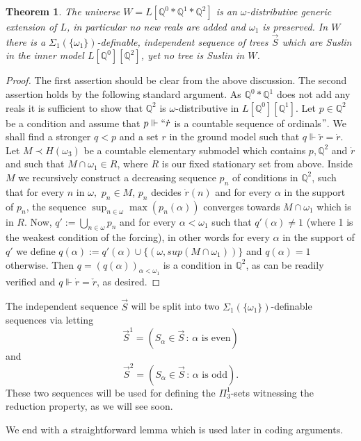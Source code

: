 \documentclass[a4paper,11pt]{article}
\newtheorem{theorem}{Theorem}[section]
\newcommand{\forceQ}{\mathbb{Q}}
\begin{document}
\begin{theorem}
The universe $W= L[\forceQ^0 \ast \forceQ^1 \ast \forceQ^2]$ is an $\omega$-distributive generic extension of $L$, in particular no new reals are added and $\omega_1$ is preserved. In $W$ there is a $\Sigma_1(\{\omega_1\})$-definable, independent sequence of  trees $\vec{S}$ which are Suslin in the inner model $L[\forceQ^0][\forceQ^2]$, yet no tree is Suslin in $W$. 
\end{theorem}
\begin{proof}
The first assertion should be clear from the above discussion. The second assertion holds by the following standard argument. As $\forceQ^0 \ast \forceQ^1$ does not add any reals it is sufficient to show that $\forceQ^2$ is $\omega$-distributive in $L[\forceQ^0][\forceQ^1]$.
Let $p \in \forceQ^2$ be a condition and assume that $p \Vdash ``\dot{r} $ is a countable sequence of ordinals$"$. We shall find a stronger $q < p$ and a set $r$ in the ground model such that $q \Vdash \check{r}=\dot{r}$. Let $M \prec H(\omega_3)$ be a countable elementary submodel which contains $p, \forceQ^2$ and $\dot{r}$ and such that $M \cap \omega_1 \in R$, where $R$ is our fixed stationary set from above. Inside $M$ we recursively construct a decreasing sequence $p_n$ of conditions in $\forceQ^2$, such that for every $n$ in $\omega,$ $p_n \in M$, $p_n$ decides $\dot{r}(n)$ and for every $\alpha$ in the support of $p_n$, the sequence $\operatorname{sup}_{n \in \omega} \operatorname{max}( p_n(\alpha))$ converges towards $M \cap \omega_1$ which is in $R$. Now, $q':= \bigcup_{n \in \omega} p_n$ and for every $\alpha< \omega_1$ such that $q'(\alpha)\ne 1$ (where 1 is the weakest condition of the forcing),  in other words for every $\alpha$ in the support of $q'$ we define $q(\alpha):= q'(\alpha) \cup \{(\omega,sup (M \cap \omega_1))\}$ and $q(\alpha)=1$ otherwise. Then $q=(q(\alpha))_{\alpha < \omega_1}$ is a condition in $\forceQ^2$, as can be readily verified and $q \Vdash \dot{r} = \check{r}$, as desired.
\end{proof}
The independent sequence $\vec{S}$ will be split into two $\Sigma_1(\{\omega_1\})$-definable sequences via letting
\[\vec{S}^1= ( S_{\alpha} \in \vec{S} \, : \, \alpha \text{ is even}) \] and
\[ \vec{S}^2= (  S_{\alpha} \in \vec{S} \, : \, \alpha \text{ is odd}). \]
These two sequences will be used for defining the $\Pi^1_3$-sets witnessing the reduction property, as we will see soon.

We end with a straightforward lemma which is used later in coding arguments.
\end{document}
